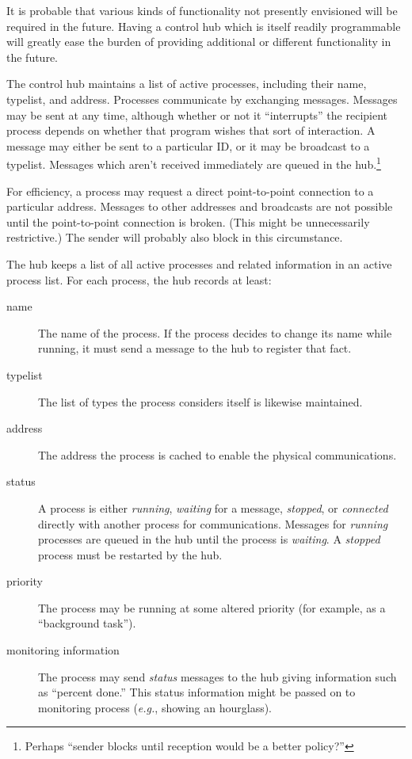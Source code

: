 It is probable that various kinds of functionality not presently
envisioned will be required in the future. Having a control hub which
is itself readily programmable will greatly ease the burden of
providing additional or different functionality in the future.

The control hub maintains a list of active processes, including their
name, typelist, and address.  Processes communicate by exchanging
messages. Messages may be sent at any time, although whether or not it
``interrupts'' the recipient process depends on whether that program
wishes that sort of interaction. A message may either be sent to a
particular ID, or it may be broadcast to a typelist.  Messages which
aren't received immediately are queued in the hub.\footnote{Perhaps
``sender blocks until reception would be a better policy?''}

For efficiency, a process may request a direct point-to-point
connection to a particular address. Messages to other addresses and
broadcasts are not possible until the point-to-point connection is
broken. (This might be unnecessarily restrictive.) The sender will
probably also block in this circumstance.

The hub keeps a list of all active processes and related information
in an active process list. For each process, the hub records at least:

\begin{description}
\item[name]
        The name of the process. If the process decides to change its
        name while running, it must send a message to the hub to
        register that fact.
\item[typelist]
        The list of types the process considers itself is likewise
        maintained.
\item[address]
        The address the process is cached to enable the physical
        communications.
\item[status]
        A process is either {\em running}, {\em waiting} for a
        message, {\em stopped}, or {\em connected} directly with
        another process for communications. Messages for {\em running}
        processes are queued in the hub until the process is {\em
        waiting}. A {\em stopped} process must be restarted by the
        hub.
\item[priority]
        The process may be running at some altered priority (for
        example, as a ``background task'').
\item[monitoring information]
        The process may send {\em status} messages to the hub giving
        information such as ``percent done.''  This status  information might
        be passed on to monitoring process ({\em e.g.}, showing an
        hourglass).
\end{description}


